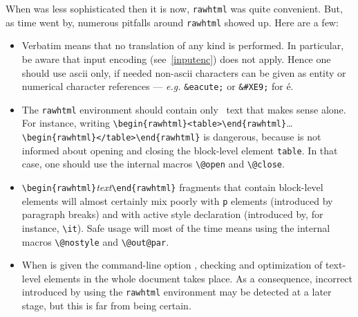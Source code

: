 When \hevea{} was less sophisticated then it is now,
\texttt{rawhtml} was quite convenient.
But, as time went by,
numerous pitfalls around \texttt{rawhtml} showed up. Here are a few:
\begin{itemize}
\item
Verbatim means that no translation of any kind is performed. In
particular, be aware that input encoding (see~\ref{inputenc}) does
not apply. Hence one should use ascii only, if needed
non-ascii characters can be given as
entity or numerical character references --- \emph{e.g.}
\verb+&eacute;+ or \verb+&#XE9;+ for \'e.

\item
The \texttt{rawhtml}
environment should contain only \html~text that makes sense alone.
For instance, writing
\verb+\begin{rawhtml}<table>\end{rawhtml}+\ldots{}
\verb+\begin{rawhtml}</table>\end{rawhtml}+ is
dangerous, because \hevea{} is not informed about opening and closing
the block-level element \texttt{table}. In that case, one should use
the internal macros \verb+\@open+ and \verb+\@close+.

\item \verb+\begin{rawhtml}+\textit{text}\verb+\end{rawhtml}+ fragments that
contain block-level elements will almost certainly mix poorly with
\verb+p+ elements (introduced by paragraph breaks) and with active
style declaration (introduced by, for instance, \verb+\it+).
Safe usage will most of the time means using the internal macros
\verb+\@nostyle+ and \verb+\@out@par+.

\item When \hevea{} is given the command-line option ,
checking and optimization of text-level elements in the whole document
takes place.  As a consequence, incorrect \html{} introduced by using
the \texttt{rawhtml} environment may be detected at a later stage,
but this is far from being certain.
\end{itemize}

